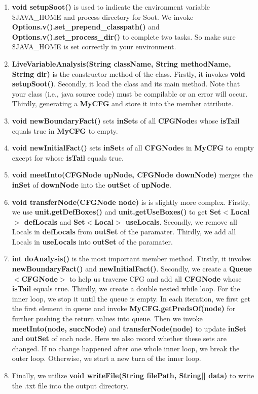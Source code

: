 \documentclass[conference]{IEEEtran}
\begin{document}
\begin{enumerate}
    \item \textbf{void setupSoot()} is used to indicate the environment variable \$JAVA\_HOME and process directory for Soot. We invoke \textbf{Options.v().set\_prepend\_classpath()} and \textbf{Options.v().set\_process\_dir()} to complete two tasks. So make sure \$JAVA\_HOME is set correctly in your environment.
    \item \textbf{LiveVariableAnalysis(String className, String methodName, String dir)} is the constructor method of the class. Firstly, it invokes \textbf{void setupSoot()}. 
    Secondly, it load the class and its main method. Note that your class (i.e., java source code) must be compilable or an error will occur.
    Thirdly, generating a \textbf{MyCFG} and store it into the member attribute.
    \item \textbf{void newBoundaryFact()} sets \textbf{inSet}s of  all \textbf{CFGNode}s whose \textbf{isTail} equals true in \textbf{MyCFG} to empty.
    \item \textbf{void newInitialFact()} sets \textbf{inSet}s of all \textbf{CFGNode}s in \textbf{MyCFG} to empty except for whose \textbf{isTail} equals true.
    \item \textbf{void meetInto(CFGNode upNode, CFGNode downNode)} merges the \textbf{inSet} of \textbf{downNode} into the \textbf{outSet} of \textbf{upNode}.
    \item \textbf{void transferNode(CFGNode node)} is is slightly more complex. Firstly, we use \textbf{unit.getDefBoxes()} and \textbf{unit.getUseBoxes()} to get \textbf{Set$<$Local$>$ defLocals} and \textbf{Set$<$Local$>$ useLocals}.
    Secondly, we remove all Locals in \textbf{defLocals} from \textbf{outSet} of the paramater.
    Thirdly, we add all Locals in \textbf{useLocals} into \textbf{outSet} of the paramater.
    \item \textbf{int doAnalysis()} is the most important member method. Firstly, it invokes \textbf{newBoundaryFact()} and \textbf{newInitialFact()}.
    Secondly, we create a \textbf{Queue$<$CFGNode$>$} to help us traverse CFG and add all \textbf{CFGNode} whose \textbf{isTail} equals true. 
    Thirdly, we create a double nested while loop. 
    For the inner loop, we stop it until the queue is empty. 
    In each iteration, we first get the first element in queue and invoke \textbf{MyCFG.getPredsOf(node)} for further pushing the return values into queue.
    Then we invoke \textbf{meetInto(node, succNode)} and \textbf{transferNode(node)} to update \textbf{inSet} and \textbf{outSet} of each node.
    Here we also record whether these sets are changed.
    If no change happened after one whole inner loop, we break the outer loop. 
    Otherwise, we start a new turn of the inner loop.
    \item Finally, we utilize \textbf{void writeFile(String filePath, String[] data)} to write the .txt file into the output directory.
\end{enumerate}
\end{document}
